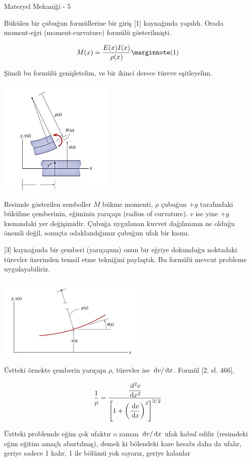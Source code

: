 \documentclass[12pt,fleqn]{article}\usepackage{../../common}
\begin{document}
Materyel Mekaniği - 5

Bükülen bir çubuğun formüllerine bir giriş [1] kaynağında yapıldı. Orada
moment-eğri (moment-curvature) formülü gösterilmişti.

$$
M(x) = \frac{E(x)I(x)}{\rho(x)}
\mlabel{1}
$$

Şimdi bu formülü genişletelim, ve bir ikinci derece türeve eşitleyelim.

\includegraphics[width=15em]{phy_020_strs_05_01.jpg}

Resimde gösterilen semboller $M$ bükme momenti, $\rho$ çubuğun $+y$ tarafındaki
bükülme çemberinin, eğiminin yarıçapı (radius of curvature).  $v$ ise yine $+y$
kısmındaki yer değişimidir. Çubuğa uygulanan kuvvet dağılımının ne olduğu
önemli değil, sonuçta odaklandığımız çubuğun ufak bir kısmı.

[3] kaynağında bir çemberi (yarıçapını) onun bir eğriye dokunduğu noktadaki
türevler üzerinden temsil etme tekniğini paylaştık. Bu formülü mevcut probleme
uygulayabiliriz.

\includegraphics[width=20em]{phy_020_strs_05_02.jpg}

Üstteki örnekte çemberin yarıçapı $\rho$, türevler ise $\,\mathrm{d} v / \,\mathrm{d} x$.
Formül [2, sf. 466],

$$
\frac{1}{\rho} =
\frac
{\dfrac{\,\mathrm{d}^2 v}{\,\mathrm{d} x^2}}
{ \left[ 1 + \left( \dfrac{\,\mathrm{d} v}{\,\mathrm{d} x}  \right)^2 \right]^{3/2} }
$$

Üstteki problemde eğim çok ufaktır o zaman $\,\mathrm{d} v / \,\mathrm{d} x$ ufak kabul edilir
(resimdeki eğim eğitim amaçlı abartılmış), demek ki bölendeki kare hesabı
daha da ufalır, geriye sadece 1 kalır, 1 ile bölümü yok sayarız, geriye kalanlar
\end{document}
